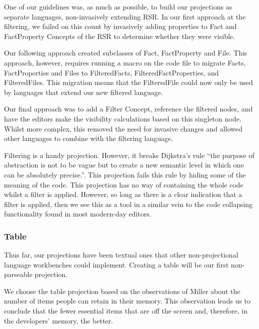 One of our guidelines was, as much as possible, to build our projections as separate languages, non-invasively extending RSR.
In our first approach at the filtering, we failed on this count by invasively adding properties to Fact and FactProperty Concepts of the RSR to determine whether they were visible.

Our following approach created subclasses of Fact, FactProperty and File.
This approach, however, requires running a macro on the code file to migrate Facts, FactProperties and Files to FilteredFacts, FilteredFactProperties, and FilteredFiles.
This migration means that the FilteredFile could now only be used by languages that extend our new filtered language.

Our final approach was to add a Filter Concept, reference the filtered nodes, and have the editors make the visibility calculations based on this singleton node.
Whilst more complex, this removed the need for invasive changes and allowed other languages to combine with the filtering language.

Filtering is a handy projection.
However, it breaks Dijkstra's rule ``the purpose of abstraction is not to be vague but to create a new semantic level in which one can be absolutely precise.''\cite{dijkstra1972humble}.
This projection fails this rule by hiding some of the meaning of the code.
This projection has no way of containing the whole code whilst a filter is applied.
However, so long as there is a clear indication that a filter is applied, then we see this as a tool in a similar vein to the code collapsing functionality found in most modern-day editors.

\subsubsection{Table}
Thus far, our projections have been textual ones that other non-projectional language workbenches could implement.
Creating a table will be our first non-parseable projection.

We choose the table projection based on the observations of Miller\cite{miller1956magical} about the number of items people can retain in their memory.
This observation leads us to conclude that the fewer essential items that are off the screen and, therefore, in the developers' memory, the better.

